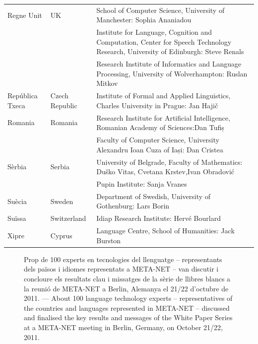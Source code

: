 \begin{longtable}{@{}llp{113mm}@{}}
  Regne Unit & \textcolor{grey1}{UK} & 
  School of Computer Science, University of Manchester: Sophia Ananiadou \\ \addlinespace 
  & & Institute for Language, Cognition and Computation, Center for Speech Technology Research, University of Edinburgh: Steve Renals \\ \addlinespace 
  & & Research Institute of Informatics and Language Processing, University of Wolverhampton: Ruslan Mitkov \\ \addlinespace 
  República Txeca & \textcolor{grey1}{Czech Republic} & Institute of Formal and Applied Linguistics, Charles University in Prague: Jan Hajič \\ \addlinespace
  Romania & \textcolor{grey1}{Romania} & Research Institute for Artificial Intelligence, Romanian Academy of Sciences:\newline Dan Tufiș \\ \addlinespace
  & & Faculty of Computer Science, University Alexandru Ioan Cuza of Iași: Dan Cristea \\ \addlinespace
  Sèrbia & \textcolor{grey1}{Serbia} & University of Belgrade, Faculty of Mathematics: Duško Vitas, Cvetana Krstev,\newline Ivan Obradović \\ \addlinespace
  & & Pupin Institute: Sanja Vranes \\ \addlinespace  
  Suècia & \textcolor{grey1}{Sweden} & Department of Swedish, University of Gothenburg: Lars Borin \\ \addlinespace 
  Suïssa & \textcolor{grey1}{Switzerland} & Idiap Research Institute: Hervé Bourlard \\ \addlinespace 
  Xipre & \textcolor{grey1}{Cyprus} & Language Centre, School of Humanities: Jack Burston
\end{longtable}
\normalsize

\renewcommand*{\figureformat}{}
\renewcommand*{\captionformat}{}

\begin{figure}[htbp]
  \center
  \caption{Prop de 100 experts en tecnologies del llenguatge -- representants dels països i idiomes representats a META-NET --  van discutir i concloure els resultats clau i missatges de la sèrie de llibres blancs a la reunió de META-NET a Berlin, Alemanya el 21/22 d'octubre de 2011. ---
 \textcolor{grey1}{About 100 language technology experts -- representatives of the countries and languages represented in META-NET -- discussed and finalised the key results and messages of the White Paper Series at a META-NET meeting in Berlin, Germany, on October 21/22, 2011.}}
  \medskip
\end{figure}


